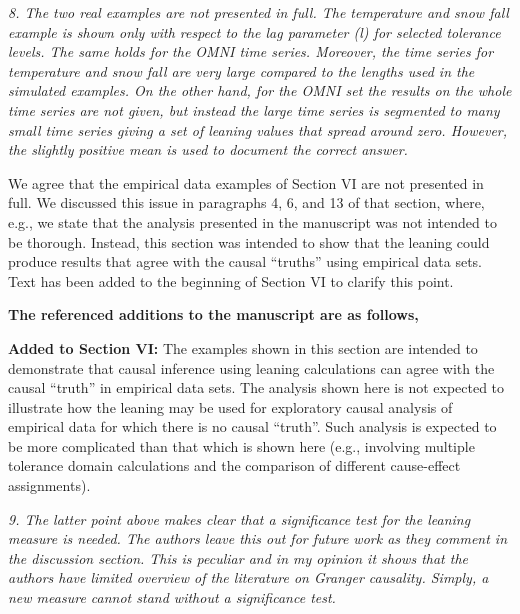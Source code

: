 \documentclass[a4paper,11pt]{article}
\begin{document}
\vspace{0.5cm}
{\em 8. The two real examples are not presented in full. The temperature and snow fall example is shown only with respect to the lag parameter (l) for selected tolerance levels. The same holds for the OMNI time series. Moreover, the time series for temperature and snow fall are very large compared to the lengths used in the simulated examples. On the other hand, for the OMNI set the results on the whole time series are not given, but instead the large time series is segmented to many small time series giving a set of leaning values that spread around zero. However, the slightly positive mean is used to document the correct answer.}
\vspace{0.5cm}

We agree that the empirical data examples of Section VI are not presented in full.  We discussed this issue in paragraphs 4, 6, and 13 of that section, where, e.g., we state that the analysis presented in the manuscript was not intended to be thorough.  Instead, this section was intended to show that the leaning could produce results that agree with the causal ``truths'' using empirical data sets.  Text has been added to the beginning of Section VI to clarify this point.

{\bf The referenced additions to the manuscript are as follows,}

{\bf Added to Section VI:} The examples shown in this section are intended to demonstrate that causal inference using leaning calculations can agree with the causal ``truth'' in empirical data sets.  The analysis shown here is not expected to illustrate how the leaning may be used for exploratory causal analysis of empirical data for which there is no causal ``truth''.  Such analysis is expected to be more complicated than that which is shown here (e.g., involving multiple tolerance domain calculations and the comparison of different cause-effect assignments).

\vspace{0.5cm}
{\em 9. The latter point above makes clear that a significance test for the leaning measure is needed. The authors leave this out for future work as they comment in the discussion section. This is peculiar and in my opinion it shows that the authors have limited overview of the literature on Granger causality.  Simply, a new measure cannot stand without a significance test.}
\vspace{0.5cm}
\end{document}
